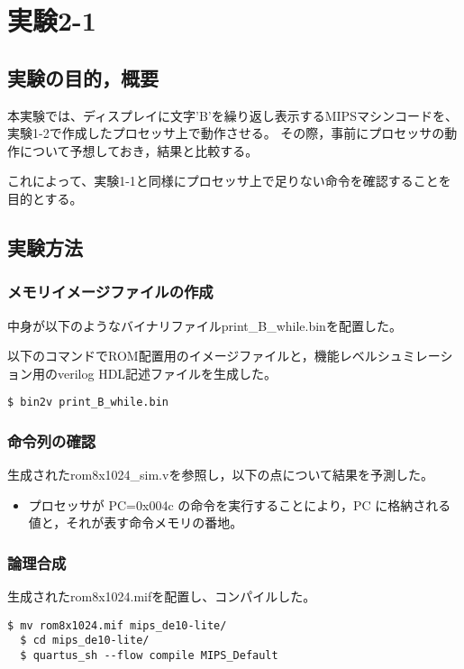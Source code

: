 
\section{実験2-1}
\subsection{実験の目的，概要}
本実験では、ディスプレイに文字'B'を繰り返し表示するMIPSマシンコードを、実験1-2で作成したプロセッサ上で動作させる。
その際，事前にプロセッサの動作について予想しておき，結果と比較する。

これによって、実験1-1と同様にプロセッサ上で足りない命令を確認することを目的とする。

\subsection{実験方法}
\subsubsection{メモリイメージファイルの作成}
中身が以下のようなバイナリファイルprint\_B\_while.binを配置した。


以下のコマンドでROM配置用のイメージファイルと，機能レベルシュミレーション用のverilog HDL記述ファイルを生成した。
\begin{lstlisting}[caption={イメージファイルの作成},label={イメージファイルの作成2-1}]
  $ bin2v print_B_while.bin
\end{lstlisting}

\subsubsection{命令列の確認}
生成されたrom8x1024\_sim.vを参照し，以下の点について結果を予測した。
\begin{itemize}
  \item プロセッサが PC=0x004c の命令を実行することにより，PC に格納される値と，それが表す命令メモリの番地。
\end{itemize}

\subsubsection{論理合成}
生成されたrom8x1024.mifを配置し、コンパイルした。
\begin{lstlisting}[caption={論理合成操作},label={論理合成操作2-1}]
  $ mv rom8x1024.mif mips_de10-lite/
  $ cd mips_de10-lite/
  $ quartus_sh --flow compile MIPS_Default
\end{lstlisting}

